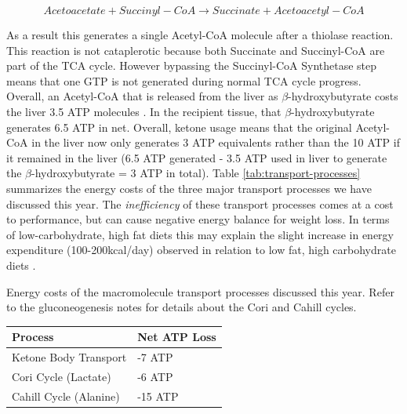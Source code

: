 \documentclass{tufte-handout}
\begin{document}
\begin{equation}\label{eq:oxct1}
Acetoacetate + Succinyl-CoA \rightarrow Succinate + Acetoacetyl-CoA
\end{equation} 

As a result this generates a single Acetyl-CoA molecule after a thiolase reaction.  This reaction is not cataplerotic because both Succinate and Succinyl-CoA are part of the TCA cycle.  However bypassing the Succinyl-CoA Synthetase step means that one GTP is not generated during normal TCA cycle progress.  Overall, an Acetyl-CoA that is released from the liver as $\beta$-hydroxybutyrate costs the liver 3.5 ATP molecules .  In the recipient tissue, that $\beta$-hydroxybutyrate generates 6.5 ATP in net.  Overall, ketone usage means that the original Acetyl-CoA in the liver now only generates 3 ATP equivalents rather than the 10 ATP if it remained in the liver (6.5 ATP generated - 3.5 ATP used in liver to generate the $\beta$-hydroxybutyrate = 3 ATP in total).  Table \ref{tab:transport-processes} summarizes the energy costs of the three major transport processes we have discussed this year.  The \emph{inefficiency} of these transport processes comes at a cost to performance, but can cause negative energy balance for weight loss.  In terms of low-carbohydrate, high fat diets this may explain the slight increase in energy expenditure (100-200kcal/day) observed in relation to low fat, high carbohydrate diets \citep{Hall2016a,Ebbeling2018}.

\begin{margintable}
\centering
\caption{Energy costs of the macromolecule transport processes discussed this year.  Refer to the gluconeogenesis notes for details about the Cori and Cahill cycles.}
\label{tab:transport-processes}
\begin{tabular}{@{}ll@{}}
\toprule
\textbf{Process} & \textbf{Net ATP Loss} \\ \midrule
Ketone Body Transport  &  -7 ATP  \\
Cori Cycle (Lactate)    & -6 ATP  \\
Cahill Cycle (Alanine)       & -15 ATP \\ \bottomrule
\end{tabular}
\end{margintable}
\end{document}
